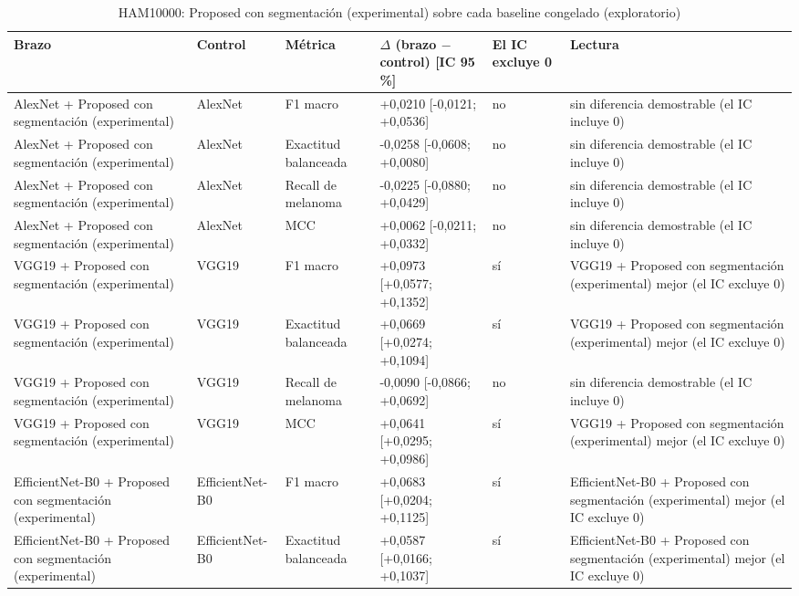 \begingroup\scriptsize
\begin{longtable}{@{}llllll@{}}
\caption{HAM10000: Proposed con segmentación (experimental) sobre cada baseline congelado (exploratorio)}\label{tab:contrast-e3b-f4} \\
\toprule
Brazo & Control & Métrica & $\Delta$ (brazo $-$ control) [IC 95 \%] & El IC excluye 0 & Lectura \\
\midrule
AlexNet + Proposed con segmentación (experimental) & AlexNet & F1 macro & +0,0210 [-0,0121; +0,0536] & no & sin diferencia demostrable (el IC incluye 0) \\
AlexNet + Proposed con segmentación (experimental) & AlexNet & Exactitud balanceada & -0,0258 [-0,0608; +0,0080] & no & sin diferencia demostrable (el IC incluye 0) \\
AlexNet + Proposed con segmentación (experimental) & AlexNet & Recall de melanoma & -0,0225 [-0,0880; +0,0429] & no & sin diferencia demostrable (el IC incluye 0) \\
AlexNet + Proposed con segmentación (experimental) & AlexNet & MCC & +0,0062 [-0,0211; +0,0332] & no & sin diferencia demostrable (el IC incluye 0) \\
VGG19 + Proposed con segmentación (experimental) & VGG19 & F1 macro & +0,0973 [+0,0577; +0,1352] & sí & VGG19 + Proposed con segmentación (experimental) mejor (el IC excluye 0) \\
VGG19 + Proposed con segmentación (experimental) & VGG19 & Exactitud balanceada & +0,0669 [+0,0274; +0,1094] & sí & VGG19 + Proposed con segmentación (experimental) mejor (el IC excluye 0) \\
VGG19 + Proposed con segmentación (experimental) & VGG19 & Recall de melanoma & -0,0090 [-0,0866; +0,0692] & no & sin diferencia demostrable (el IC incluye 0) \\
VGG19 + Proposed con segmentación (experimental) & VGG19 & MCC & +0,0641 [+0,0295; +0,0986] & sí & VGG19 + Proposed con segmentación (experimental) mejor (el IC excluye 0) \\
EfficientNet-B0 + Proposed con segmentación (experimental) & EfficientNet-B0 & F1 macro & +0,0683 [+0,0204; +0,1125] & sí & EfficientNet-B0 + Proposed con segmentación (experimental) mejor (el IC excluye 0) \\
EfficientNet-B0 + Proposed con segmentación (experimental) & EfficientNet-B0 & Exactitud balanceada & +0,0587 [+0,0166; +0,1037] & sí & EfficientNet-B0 + Proposed con segmentación (experimental) mejor (el IC excluye 0) \\

\end{longtable}
